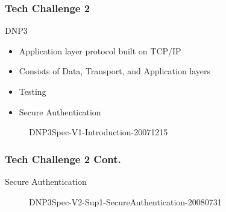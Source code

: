 \begin{frame}
\frametitle{Tech Challenge 2}
\begin{block}{DNP3}
\begin{itemize}
\item Application layer protocol built on TCP/IP
\item Consists of Data, Transport, and Application layers
\item Testing
\item Secure Authentication
\end{itemize}
\end{block}
\begin{figure}
\caption{DNP3Spec-V1-Introduction-20071215}
\end{figure}	
\end{frame}

\begin{frame}
\frametitle{Tech Challenge 2 Cont.}

\begin{block}{Secure Authentication}
\begin{figure}
\caption{DNP3Spec-V2-Sup1-SecureAuthentication-20080731}
\end{figure}
\end{block}
\end{frame}


